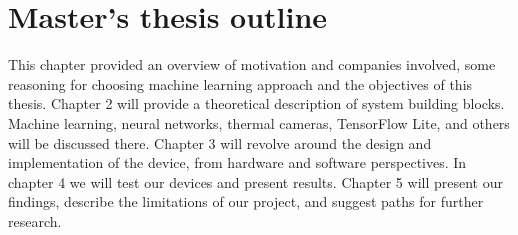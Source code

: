 \section{ Master's thesis outline}

This chapter provided an overview of motivation and companies involved, some reasoning for choosing machine learning approach and the objectives of this thesis.
Chapter 2 will provide a theoretical description of system building blocks. Machine learning, neural networks, thermal cameras, TensorFlow Lite, and others will be discussed there.
Chapter 3 will revolve around the design and implementation of the device, from hardware and software perspectives.
In chapter 4 we will test our devices and present results.
Chapter 5 will present our findings, describe the limitations of our project, and suggest paths for further research.

